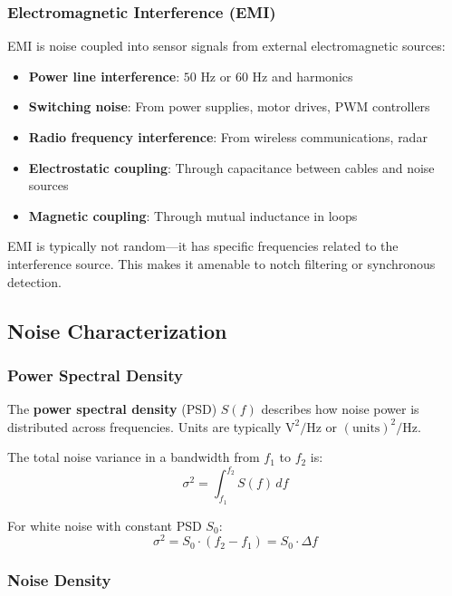 \subsubsection{Electromagnetic Interference (EMI)}

EMI is noise coupled into sensor signals from external electromagnetic sources:
\begin{itemize}
    \item \textbf{Power line interference}: $50\text{ Hz}$ or $60\text{ Hz}$ and harmonics
    \item \textbf{Switching noise}: From power supplies, motor drives, PWM controllers
    \item \textbf{Radio frequency interference}: From wireless communications, radar
    \item \textbf{Electrostatic coupling}: Through capacitance between cables and noise sources
    \item \textbf{Magnetic coupling}: Through mutual inductance in loops
\end{itemize}

EMI is typically not random---it has specific frequencies related to the interference source. This makes it amenable to notch filtering or synchronous detection.

\subsection{Noise Characterization}

\subsubsection{Power Spectral Density}

The \textbf{power spectral density} (PSD) $S(f)$ describes how noise power is distributed across frequencies. Units are typically $\text{V}^2/\text{Hz}$ or $(\text{units})^2/\text{Hz}$.

The total noise variance in a bandwidth from $f_1$ to $f_2$ is:
\begin{equation}
\sigma^2 = \int_{f_1}^{f_2} S(f) \, df
\label{eq:noise_variance}
\end{equation}

For white noise with constant PSD $S_0$:
\begin{equation}
\sigma^2 = S_0 \cdot (f_2 - f_1) = S_0 \cdot \Delta f
\end{equation}

\subsubsection{Noise Density}


